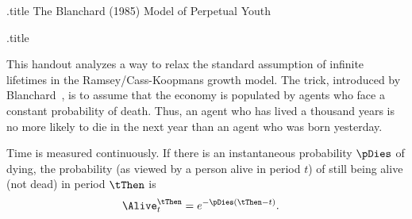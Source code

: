 \documentclass{handout}
\begin{document}
\handoutHeader

\begin{verbatimwrite}{\jobname.title}
The Blanchard (1985) Model of Perpetual Youth
\end{verbatimwrite}

\centerline{\LARGE  \jobname.title}
\medskip 
\medskip\medskip

This handout analyzes a way to relax the standard assumption of infinite
lifetimes in the Ramsey/Cass-Koopmans
growth model.  The trick, introduced by
Blanchard~\citeyearpar{blanchardFinite}, is to assume that the economy
is populated by agents who face a constant probability of death.
Thus, an agent who has lived a thousand years is no more likely to die
in the next year than an agent who was born yesterday.

Time is measured continuously.  If there is an instantaneous
probability $\pDies$ of dying, the probability (as viewed by a person
alive in period $t$) of still being alive (not dead) in period
$\tThen$ is
\begin{equation}\begin{gathered}\begin{aligned}
        \Alive_{t}^{\tThen} & =  e^{-\pDies(\tThen-t)} . \label{eq:living}
\end{aligned}\end{gathered}\end{equation}
\end{document}
